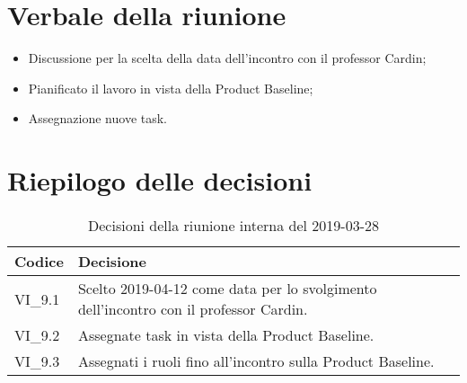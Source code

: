 \section{Verbale della riunione}
\begin{itemize}
	\item Discussione per la scelta della data dell'incontro con il professor 
	Cardin;
	\item Pianificato il lavoro in vista della Product Baseline\glo;
	\item Assegnazione nuove task.
	
\end{itemize}

\hspace{3cm}

\section{Riepilogo delle decisioni}

	
	\begin{longtable}{ >{\centering}p{} >{}p{}}
		\caption{Decisioni della riunione interna del 2019-03-28}\\	
		\rowcolorhead
		\textbf{\color{white}Codice} 
		& \centering\textbf{\color{white}Decisione} 
		\tabularnewline 
		\endfirsthead
		VI\_9.1 & Scelto 2019-04-12 come data per lo svolgimento dell'incontro 
		con il professor Cardin.
		\tabularnewline 
		VI\_9.2 & Assegnate task in vista della Product Baseline.
		\tabularnewline
		VI\_9.3 & Assegnati i ruoli fino all'incontro sulla Product Baseline.\\
		
	\end{longtable}
	




